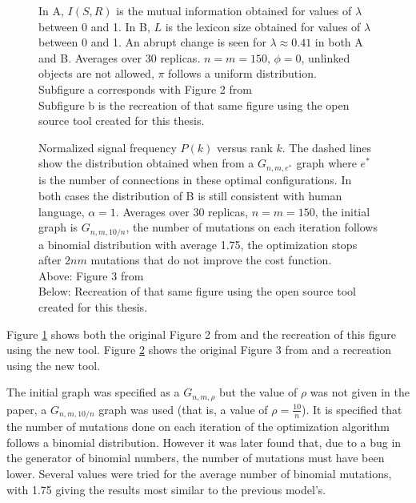 \begin{figure}
  \caption{
    In A, $I(S,R)$ is the mutual information obtained for values of $\lambda$ between 0 and 1.
    In B, $L$ is the lexicon size obtained for values of $\lambda$ between 0 and 1.
    An abrupt change is seen for $\lambda \approx 0.41$ in both A and B.
    Averages over 30 replicas.
    $n=m=150$, $\phi=0$, unlinked objects are not allowed, $\pi$ follows a uniform distribution.\\
    Subfigure a corresponds with Figure 2 from \cite{Ferrer2003a}\\
    Subfigure b is the recreation of that same figure using the open source tool created for this thesis.
  }
  \label{fig:fig2_2003}
\end{figure}

\begin{figure}
  \caption{
    Normalized signal frequency $P(k)$ versus rank $k$.
    The dashed lines show the distribution obtained when from a $G_{n,m,e^*}$ graph where $e^*$ is the number of connections in these optimal configurations.
    In both cases the distribution of B is still consistent with human language, $\alpha=1$.
    Averages over 30 replicas, $n=m=150$, the initial graph is $G_{n,m,10/n}$, the number of mutations on each iteration follows a binomial distribution with average 1.75, the optimization stops after $2nm$ mutations that do not improve the cost function.\\
    Above: Figure 3 from \cite{Ferrer2003a}\\
    Below: Recreation of that same figure using the open source tool created for this thesis.
  }
  \label{fig:fig3_2003}
\end{figure}

Figure \ref{fig:fig2_2003} shows both the original Figure 2 from \cite{Ferrer2003a} and the recreation of this figure using the new tool.
Figure \ref{fig:fig3_2003} shows the original Figure 3 from \cite{Ferrer2003a} and a recreation using the new tool.

The initial graph was specified as a $G_{n,m,\rho}$ but the value of $\rho$ was not given in the paper, a $G_{n,m,10/n}$ graph was used (that is, a value of $\rho=\frac{10}{n}$).
It is specified that the number of mutations done on each iteration of the optimization algorithm follows a binomial distribution.
However it was later found that, due to a bug in the generator of binomial numbers, the number of mutations must have been lower.
Several values were tried for the average number of binomial mutations, with 1.75 giving the results most similar to the previous model's.

